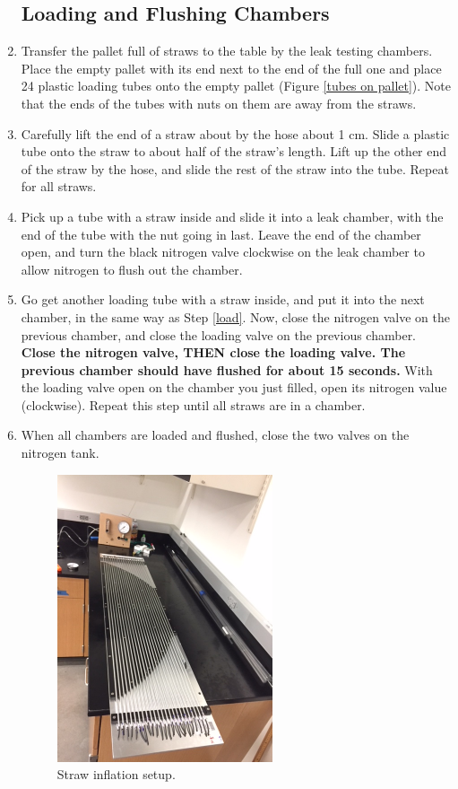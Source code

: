 \documentclass[letterpaper,12pt]{article}
\begin{document}
\begin{enumerate}
\subsection{Loading and Flushing Chambers}	
		\item Transfer the pallet full of straws to the table by the leak testing chambers. Place the empty pallet with its end next to the end of the full one and place 24 plastic loading tubes onto the empty pallet (Figure \ref{tubes on pallet}).	Note that the ends of the tubes with nuts on them are away from the straws.	
		\item Carefully lift the end of a straw about by the hose about 1 cm. Slide a plastic tube onto the straw to about half of the straw's length. Lift up the other end of the straw by the hose, and slide the rest of the straw into the tube. Repeat for all straws.
		 \item Pick up a tube with a straw inside and slide it into a leak chamber, with the end of the tube with the nut going in last. Leave the end of the chamber open, and turn the black nitrogen valve clockwise on the leak chamber to allow nitrogen to flush out the chamber. \label{load}
		 \item Go get another loading tube with a straw inside, and put it into the next chamber, in the same way as Step \ref{load}. Now, close the nitrogen valve on the previous chamber, and close the loading valve on the previous chamber. {\bf Close the nitrogen valve, THEN close the loading valve. The previous chamber should have flushed for about 15 seconds.} With the loading valve open on the chamber you just filled, open its nitrogen value (clockwise). Repeat this step until all straws are in a chamber.
		 \item When all chambers are loaded and flushed, close the two valves on the nitrogen tank.
		 
\begin{figure}
	\centering
	\includegraphics[width=0.6\textwidth, angle=-90]{inflate_setup}
	\caption{Straw inflation setup.}
	\label{inflate setup}
\end{figure}
        
\end{enumerate}
\end{document}
